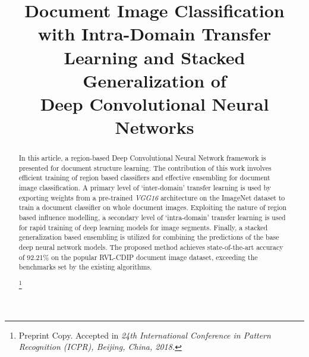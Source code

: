 \documentclass[10pt,conference,a4paper]{IEEEtran}
\newcommand\blfootnote[1]{\begingroup
	\renewcommand\thefootnote{}\footnote{#1}\addtocounter{footnote}{-1}\endgroup
}
\begin{document}
\title{Document Image Classification with Intra-Domain Transfer Learning and Stacked Generalization of \\Deep Convolutional Neural Networks\\
}

\author{
\and
{}
\and
{}
\and
{}



}

\maketitle

\begin{abstract}
In this article, a region-based Deep Convolutional Neural Network framework is presented for document structure learning. The contribution of this work involves efficient training of region based classifiers and effective ensembling for document image classification. A primary level of `inter-domain' transfer learning is used by exporting weights from a pre-trained \textit{VGG16} architecture on the ImageNet dataset to train a document classifier on whole document images. Exploiting the nature of region based influence modelling, a secondary level of `intra-domain' transfer learning is used for rapid training of deep learning models for image segments. Finally, a stacked generalization based ensembling is utilized for combining the predictions of the base deep neural network models. The proposed method achieves state-of-the-art accuracy of 92.21\% on the popular RVL-CDIP document image dataset, exceeding the benchmarks set by the existing algorithms.

\blfootnote{Preprint Copy. Accepted in \textit{24th International Conference in Pattern Recognition (ICPR), Beijing, China, 2018.}}

\end{abstract}
\end{document}
